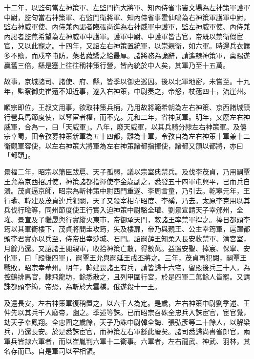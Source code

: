 \begin{pinyinscope}
 十二年，以監句當左神策軍、左監門衛大將軍、知內侍省事竇文場為左神策軍護軍中尉，監句當右神策軍、右監門衛將軍、知內侍省事霍仙鳴為右神策軍護軍中尉，監右神威軍使、內侍兼內謁者臨張尚進為右神威軍中護軍，監左神威軍使、內侍兼內謁者監焦希望為左神威軍中護軍。護軍中尉、中護軍皆古官，帝既以禁衛假宦官，又以此寵之。十四年，又詔左右神策置統軍，以崇親衛，如六軍。時邊兵衣饟多不贍，而戍卒屯防，藥茗蔬醬之給最厚。諸將務為詭辭，請遙隸神策軍，稟賜遂贏舊三倍，繇是塞上往往稱神策行營，皆內統於中人矣，其軍乃至十五萬。



 故事，京城諸司、諸使、府、縣，皆季以御史巡囚。後以北軍地密，未嘗至。十九年，監察御史崔薳不知近事，遂入右神策，中尉奏之，帝怒，杖薳四十，流崖州。



 順宗即位，王叔文用事，欲取神策兵柄，乃用故將範希朝為左右神策、京西諸城鎮行營兵馬節度使，以奪宦者權，而不克。元和二年，省神武軍。明年，又廢左右神威軍，合為一，曰「天威軍」。八年，廢天威軍，以其兵騎分隸左右神策軍。及僖宗幸蜀，田令孜募神策新軍為五十四都，離為十軍，令孜自為左右神策十軍兼十二衛觀軍容使，以左右神策大將軍為左右神策諸都指揮使，諸都又領以都將，亦曰「都頭」。



 景福二年，昭宗以籓臣跋扈、天子孤弱，議以宗室典禁兵。及伐李茂貞，乃用嗣覃王允為京西招討使，神策諸都指揮使李金歲副之，悉發五十四軍屯興平，已而兵自潰。茂貞逼京師，昭宗為斬神策中尉西門重遂、李周言童，乃引去。乾寧元年，王行瑜、韓建及茂貞連兵犯闕，天子又殺宰相韋昭度、李磎，乃去。太原李克用以其兵伐行瑜等，同州節度使王行實入迫神策中尉駱全瓘、劉景宣請天子幸邠州，全瓘、景宣及子繼晟與行實縱火東市，帝御承天門，敕諸王率禁軍捍之。捧日都頭李筠以其軍衛樓下，茂貞將閻圭攻筠，矢及樓扉，帝乃與親王、公主幸筠軍，扈蹕都頭李君實亦以兵至，侍帝出幸莎城、石門。詔嗣薛王知柔入長安收禁軍、清宮室，月餘乃還。又詔諸王閱親軍，收拾神策亡散，得數萬。益置安聖、捧宸、保寧、安化軍，曰「殿後四軍」，嗣覃王允與嗣延王戒丕將之。三年，茂貞再犯闕，嗣覃王戰敗，昭宗幸華州。明年，韓建畏諸王有兵，請皆歸十六宅，留殿後兵三十人，為控鶴排馬官，隸飛龍坊，餘悉散之，且列甲圍行宮，於是四軍二萬餘人皆罷。又請誅都頭李筠，帝恐，為斬於大雲橋。俄遂殺十一王。



 及還長安，左右神策軍復稍置之，以六千人為定。是歲，左右神策中尉劉季述、王仲先以其兵千人廢帝，幽之。季述等誅。已而昭宗召硃全忠兵入誅宦官，宦官覺，劫天子幸鳳翔。全忠圍之歲餘，天子乃誅中尉韓全誨、張弘彥等二十餘人，以解梁兵，乃還長安。於是悉誅宦官，而神策左右軍繇此廢矣。諸司悉歸尚書省郎官，兩軍兵皆隸六軍者，而以崔胤判六軍十二衛事。六軍者，左右龍武、神武、羽林，其名存而已。自是軍司以宰相領。




\end{pinyinscope}
